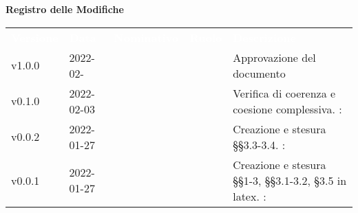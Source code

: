 

{\LARGE{\textbf{Registro delle Modifiche}}} \\
\begin{table}[!htbp]
\renewcommand{\arraystretch}{1.5}
\begin{tabular}{ m{}<{\centering}  m{}<{\centering}  m{}<{\centering}  m{}<{\centering}  m{}<{\centering} }
	\rowcolor{darkblue}
	\textcolor{white}{\textbf{Versione}} &\textcolor{white}{\textbf{Data}}& \textcolor{white}{\textbf{Nominativo}} & \textcolor{white}{\textbf{Ruolo}}&\textcolor{white}{\textbf{Descrizione}}\\ 

	v1.0.0 & 2022-02- & \ & \RE & Approvazione del documento \\

	\rowcolor{gray!25}v0.1.0& 2022-02-03 & \FP & \VE & Verifica di coerenza e coesione complessiva. \VE: \textit{\PV}\\

	v0.0.2& 2022-01-27& \FP &\AN & Creazione e stesura \S\S{}3.3-3.4. \VE: \textit{\PV}\\

	v0.0.1& 2022-01-27& \GC &\AN & Creazione e stesura \S\S{}1-3, \S\S{}3.1-3.2, \S3.5 in latex. \VE: \textit{\PV}\\

\end{tabular}
\end{table}

\pagebreak